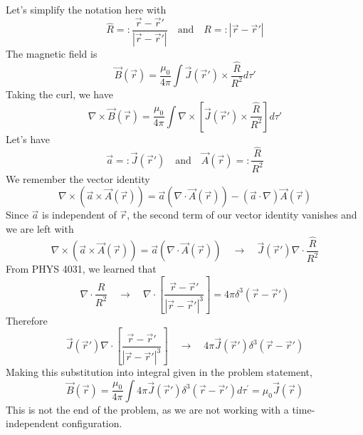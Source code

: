 \documentclass[a4paper,12pt]{article} %
\begin{document}
Let's simplify the notation here with
$$ \hat{R} =: \frac{\vec{r} - \overrightarrow{r}'}{|\vec{r} - \overrightarrow{r}'|} \quad \text{and} \quad R =: |\vec{r} - \overrightarrow{r}'| $$
The magnetic field is
$$ \vec{B}(\vec{r}) = \frac{\mu_0}{4\pi} \int \vec{J}(\overrightarrow{r}')\times \frac{\hat{R}}{R^2} d\tau' $$
Taking the curl, we have
$$ \nabla \times \vec{B}(\vec{r}) = \frac{\mu_0}{4\pi} \int \nabla \times \left[ \vec{J}(\overrightarrow{r}')\times \frac{\hat{R}}{R^2} \right] d\tau'$$
Let's have
$$ \vec{a} =: \vec{J}(\overrightarrow{r}') \quad\text{and}\quad \vec{A}(\vec{r}) =: \frac{\hat{R}}{R^2} $$
We remember the vector identity
$$ \nabla\times\left(\vec{a} \times \vec{A}(\vec{r})\right) = \vec{a}\left(\nabla\cdot\vec{A}(\vec{r})\right) - \left(\vec{a}\cdot\nabla\right)\vec{A}(\vec{r}) $$
Since $\vec{a}$ is independent of $\vec{r}$, the second term of our vector identity vanishes and we are left with
$$ \nabla\times\left(\vec{a} \times \vec{A}(\vec{r})\right) = \vec{a}\left(\nabla\cdot\vec{A}(\vec{r})\right) \quad\rightarrow\quad \vec{J}(\overrightarrow{r}')\nabla \cdot \frac{\hat{R}}{R^2} $$
From PHYS 4031, we learned that
$$ \nabla \cdot \frac{\hat{R}}{R^2} \quad\rightarrow\quad \nabla \cdot \left[\frac{\vec{r} - \overrightarrow{r}'}{|\vec{r} - \overrightarrow{r}'|^3}\right] = 4\pi\delta^3(\vec{r} - \overrightarrow{r}') $$
Therefore
$$ \vec{J}(\overrightarrow{r}')\nabla \cdot \left[\frac{\vec{r} - \overrightarrow{r}'}{|\vec{r} - \overrightarrow{r}'|^3}\right] \quad\rightarrow\quad 4\pi\vec{J}(\overrightarrow{r}')\delta^3(\vec{r} - \overrightarrow{r}') $$
Making this substitution into integral given in the problem statement,
$$ \boxed{\vec{B}(\vec{r})=\frac{\mu_0}{4 \pi} \int 4\pi\vec{J}(\overrightarrow{r}')\delta^3(\vec{r} - \overrightarrow{r}') d \tau^{\prime} = \mu_0\vec{J}(\vec{r})} $$
This is not the end of the problem, as we are not working with a time-independent configuration.\\
\end{document}
